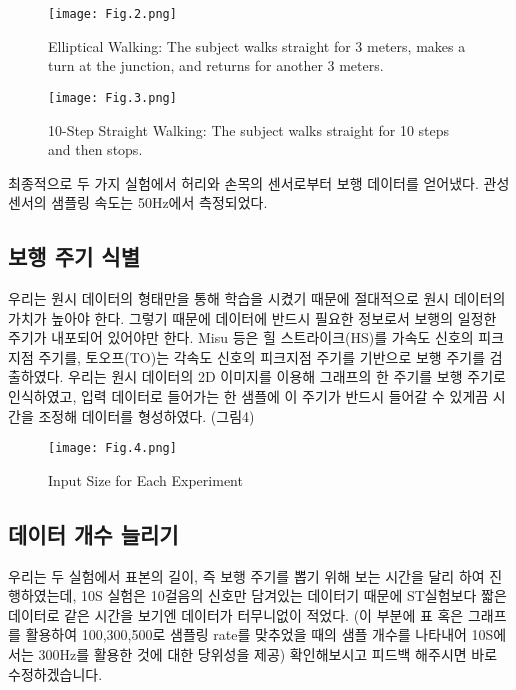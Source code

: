 \documentclass{article}
\begin{document}
\begin{figure}
\centering
\texttt{[image: Fig.2.png]}
\caption{\label{Figure.2:}Elliptical Walking: The subject walks straight for 3 meters, makes a turn at the junction, and returns for another 3 meters.}
\end{figure}

\begin{figure}
\centering
\texttt{[image: Fig.3.png]}
\caption{\label{Figure.3:}10-Step Straight Walking: The subject walks straight for 10 steps and then stops.}
\end{figure}

최종적으로 두 가지 실험에서 허리와 손목의 센서로부터 보행 데이터를
얻어냈다. 관성 센서의 샘플링 속도는 50Hz에서 측정되었다.

\subsection{보행 주기 식별}

우리는 원시 데이터의 형태만을 통해 학습을 시켰기 때문에 절대적으로 원시
데이터의 가치가 높아야 한다. 그렇기 때문에 데이터에 반드시 필요한
정보로서 보행의 일정한 주기가 내포되어 있어야만 한다. Misu
등\cite{misu_development_2017}은 힐 스트라이크(HS)를 가속도 신호의 피크 지점
주기를, 토오프(TO)는 각속도 신호의 피크지점 주기를 기반으로 보행 주기를
검출하였다. 우리는 원시 데이터의 2D 이미지를 이용해 그래프의 한 주기를
보행 주기로 인식하였고, 입력 데이터로 들어가는 한 샘플에 이 주기가
반드시 들어갈 수 있게끔 시간을 조정해 데이터를 형성하였다. (그림4)

\begin{figure}
\centering
\texttt{[image: Fig.4.png]}
\caption{\label{Figure.4:}Input Size for Each Experiment}
\end{figure}

\subsection{데이터 개수 늘리기}

우리는 두 실험에서 표본의 길이, 즉 보행 주기를 뽑기 위해 보는 시간을
달리 하여 진행하였는데, 10S 실험은 10걸음의 신호만 담겨있는 데이터기
때문에 ST실험보다 짧은 데이터로 같은 시간을 보기엔 데이터가 터무니없이
적었다. 
(이 부분에 표 혹은 그래프를 활용하여 100,300,500로 샘플링 rate를
맞추었을 때의 샘플 개수를 나타내어 10S에서는 300Hz를 활용한 것에 대한
당위성을 제공) 확인해보시고 피드백 해주시면 바로 수정하겠습니다.
\end{document}
